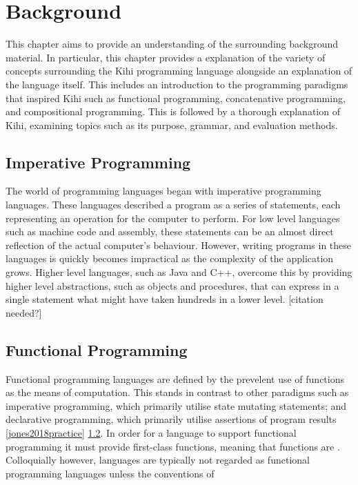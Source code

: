 \chapter{Background} \label{C:background}
This chapter aims to provide an understanding of the surrounding background material. In particular, this chapter provides a explanation of the variety of concepts surrounding the Kihi programming language alongside an explanation of the language itself. This includes an introduction to the programming paradigms that inspired Kihi such as functional programming, concatenative programming, and compositional programming. This is followed by a thorough explanation of Kihi, examining topics such as its purpose, grammar, and evaluation methods.

\section{Imperative Programming}
The world of programming languages began with imperative programming languages. These languages described a program as a series of statements, each representing an operation for the computer to perform. For low level languages such as machine code and assembly, these statements can be an almost direct reflection of the actual computer's behaviour. However, writing programs in these languages is quickly becomes impractical as the complexity of the application grows. Higher level languages, such as Java and C++, overcome this by providing higher level abstractions, such as objects and procedures, that can express in a single statement what might have taken hundreds in a lower level.
[citation needed?]


\section{Functional Programming}

Functional programming languages are defined by the prevelent use of functions as the means of computation. This stands in contrast to other paradigms such as imperative programming, which primarily utilise state mutating statements; and declarative programming, which primarily utilise assertions of program results \ref{jones2018practice} \ref{}. In order for a language to support functional programming it must provide first-class functions, meaning that functions are . Colloquially however, languages are typically not regarded as functional programming languages unless the conventions of

